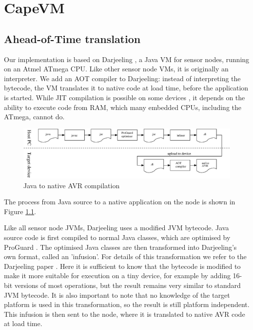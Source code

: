 \chapter{CapeVM}


\section{Ahead-of-Time translation}
\label{sec-aot-translation}
Our implementation is based on Darjeeling \cite{Brouwers:2009cj}, a Java VM for sensor nodes, running on an Atmel ATmega CPU. Like other sensor node VMs, it is originally an interpreter. We add an AOT compiler to Darjeeling: instead of interpreting the bytecode, the VM translates it to native code at load time, before the application is started. While JIT compilation is possible on some devices \cite{Ellul:2012thesis}, it depends on the ability to execute code from RAM, which many embedded CPUs, including the ATmega, cannot do.

\begin{figure}[]
  \includegraphics[width=\linewidth]{compilation-process.eps}
  \caption{Java to native AVR compilation}
  \label{fig-translation-process}
\end{figure}


The process from Java source to a native application on the node is shown in Figure \ref{fig-translation-process}.

Like all sensor node JVMs, Darjeeling uses a modified JVM bytecode. Java source code is first compiled to normal Java classes, which are optimised by ProGuard \cite{proguard}. The optimised Java classes are then transformed into Darjeeling's own format, called an 'infusion'. For details of this transformation we refer to the Darjeeling paper \cite{Brouwers:2009cj}. Here it is sufficient to know that the bytecode is modified to make it more suitable for execution on a tiny device, for example by adding 16-bit versions of most operations, but the result remains very similar to standard JVM bytecode. It is also important to note that no knowledge of the target platform is used in this transformation, so the result is still platform independent. This infusion is then sent to the node, where it is translated to native AVR code at load time.

